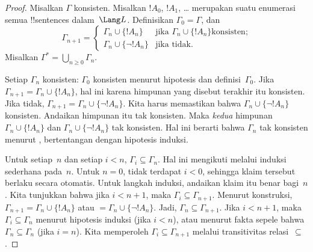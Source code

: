 \documentclass[../../../include/open-logic-section]{subfiles}
\begin{document}
\begin{proof}
Misalkan $\Gamma$ konsisten. Misalkan $!A_0$, $!A_1$,
\dots{} merupakan suatu enumerasi semua !!{sentence}s dalam~$\Lang L$.
Definisikan $\Gamma_0 = \Gamma$, dan
\[
\Gamma_{n+1} =
\begin{cases}
\Gamma_n \cup \{ !A_n \} & \textrm{jika $\Gamma_n \cup \{!A_n\}$
  konsisten;} \\
\Gamma_n \cup \{ \lnot !A_n \} & \textrm{jika tidak.}
\end{cases}
\]
Misalkan $\Gamma^* = \bigcup_{n \geq 0} \Gamma_n$.

Setiap $\Gamma_n$ konsisten: $\Gamma_0$ konsisten menurut hipotesis dan
definisi~$\Gamma_0$.
Jika $\Gamma_{n+1} = \Gamma_n \cup \{!A_n\}$, hal ini karena himpunan
yang disebut terakhir itu konsisten. Jika tidak, $\Gamma_{n+1} =
\Gamma_n \cup \{\lnot !A_n\}$. Kita harus memastikan bahwa
$\Gamma_n \cup \{\lnot !A_n\}$ konsisten. Andaikan himpunan itu tak
konsisten. Maka \emph{kedua} himpunan $\Gamma_n \cup \{!A_n\}$ dan
$\Gamma_n \cup \{\lnot !A_n\}$ tak konsisten. Hal ini berarti bahwa
$\Gamma_n$ tak konsisten menurut
,
bertentangan dengan hipotesis induksi.

Untuk setiap~$n$ dan setiap $i < n$, $\Gamma_i \subseteq \Gamma_n$.
Hal ini mengikuti melalui induksi sederhana pada~$n$. Untuk $n=0$,
tidak terdapat $i < 0$, sehingga klaim tersebut berlaku secara otomatis.
Untuk langkah induksi, andaikan klaim itu benar bagi~$n$. Kita tunjukkan
bahwa jika $i < n+1$, maka $\Gamma_i \subseteq \Gamma_{n+1}$. Menurut
konstruksi, $\Gamma_{n+1} = \Gamma_n \cup \{!A_n\}$ atau
$= \Gamma_n \cup \{\lnot !A_n\}$. Jadi, $\Gamma_n \subseteq
\Gamma_{n+1}$. Jika $i < n+1$, maka $\Gamma_i \subseteq \Gamma_n$
menurut hipotesis induksi (jika $i < n$), atau menurut fakta sepele bahwa
$\Gamma_n \subseteq \Gamma_n$ (jika $i = n$). Kita memperoleh
$\Gamma_i \subseteq \Gamma_{n+1}$ melalui transitivitas
relasi~$\subseteq$.


\end{proof}
\end{document}
